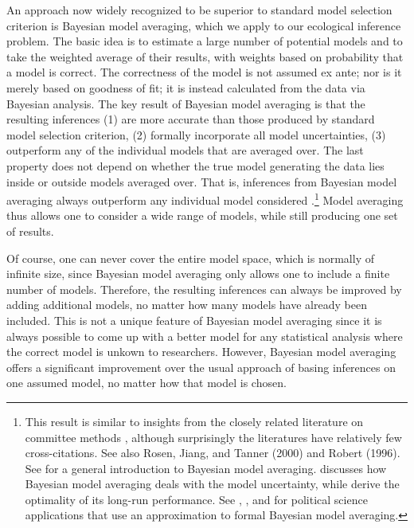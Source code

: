 \documentclass[11pt,titlepage]{article}
\begin{document}
An approach now widely recognized to be superior to standard model
selection criterion is Bayesian model averaging, which we apply to our
ecological inference problem.  The basic idea is to estimate a large
number of potential models and to take the weighted average of their
results, with weights based on probability that a model is correct.
The correctness of the model is not assumed ex ante; nor is it merely
based on goodness of fit; it is instead calculated from the data via
Bayesian analysis.  The key result of Bayesian model averaging is that
the resulting inferences (1) are more accurate than those produced by
standard model selection criterion, (2) formally incorporate all model
uncertainties, (3) outperform any of the individual models that are
averaged over.  The last property does not depend on whether the true
model generating the data lies inside or outside models averaged over.
That is, inferences from Bayesian model averaging always outperform
any individual model considered
\citep[e.g.,][]{madi:raft:94}.\footnote{This result is similar to
  insights from the closely related literature on committee methods
  \citep{bish:95}, although surprisingly the literatures have
  relatively few cross-citations.  See also Rosen, Jiang, and Tanner
  (2000) and Robert (1996)\nocite{rose:jian:tann:00,robe:96a}.  See
  \citet{hoet:madi:raft:voli:99} for a general introduction to
  Bayesian model averaging.  \citet{drap:95} discusses how Bayesian
  model averaging deals with the model uncertainty, while
  \citet{raft:zhen:03} derive the optimality of its long-run
  performance. See \citet{bart:97}, \citet{BarZal01}, and
  \citet{EriBafWil02} for political science applications that use an
  approximation to formal Bayesian model averaging.} Model averaging
thus allows one to consider a wide range of models, while still
producing one set of results.

Of course, one can never cover the entire model space, which is
normally of infinite size, since Bayesian model averaging only allows
one to include a finite number of models.  Therefore, the resulting
inferences can always be improved by adding additional models, no
matter how many models have already been included.  This is not a
unique feature of Bayesian model averaging since it is always possible
to come up with a better model for any statistical analysis where the
correct model is unkown to researchers.  However, Bayesian model
averaging offers a significant improvement over the usual approach of
basing inferences on one assumed model, no matter how that model is
chosen.
\end{document}
